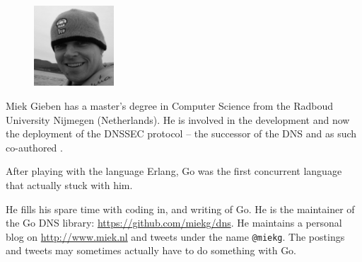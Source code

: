 \begin{figure}
  \begin{center}
  \includegraphics[width=3cm]{fig/avatar-miekg-300x300}
  \end{center}
\end{figure}
Miek Gieben has a master's degree in Computer Science from the Radboud University Nijmegen (Netherlands).
He is involved in the development and now the deployment of the DNSSEC protocol --
the successor of the DNS and as such co-authored \cite{RFC4641}.

After playing with the language Erlang, Go was the first concurrent language
that actually stuck with him.

He fills his spare time with coding in, and writing of Go. He is the maintainer
of the Go DNS library: \url{https://github.com/miekg/dns}.
He maintains a personal blog on \url{http://www.miek.nl} and tweets
under the name \texttt{@miekg}. The postings and tweets may sometimes 
actually have to do something with Go.
